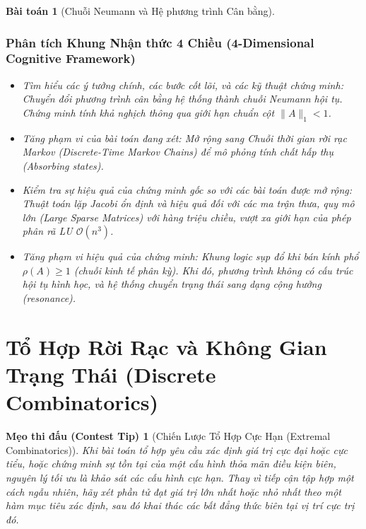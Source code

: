 \documentclass{article}
\newtheorem{baitoan}{Bài toán}
\newtheorem{tip}{Mẹo thi đấu (Contest Tip)}
\begin{document}
\begin{baitoan}[Chuỗi Neumann và Hệ phương trình Cân bằng]
 \subsubsection*{Phân tích Khung Nhận thức 4 Chiều (4-Dimensional Cognitive Framework)}
 \begin{itemize}
 \item \textit{Tìm hiểu các ý tưởng chính, các bước cốt lõi, và các kỹ thuật chứng minh}: Chuyển đổi phương trình cân bằng hệ thống thành chuỗi Neumann hội tụ. Chứng minh tính khả nghịch thông qua giới hạn chuẩn cột $\|A\|_1 < 1$.
 \item \textit{Tăng phạm vi của bài toán đang xét}: Mở rộng sang Chuỗi thời gian rời rạc Markov (Discrete-Time Markov Chains) để mô phỏng tính chất hấp thụ (Absorbing states).
 \item \textit{Kiểm tra sự hiệu quả của chứng minh gốc so với các bài toán được mở rộng}: Thuật toán lặp Jacobi ổn định và hiệu quả đối với các ma trận thưa, quy mô lớn (Large Sparse Matrices) với hàng triệu chiều, vượt xa giới hạn của phép phân rã LU $\mathcal{O}(n^3)$.
 \item \textit{Tăng phạm vi hiệu quả của chứng minh}: Khung logic sụp đổ khi bán kính phổ $\rho(A) \ge 1$ (chuỗi kinh tế phân kỳ). Khi đó, phương trình không có cấu trúc hội tụ hình học, và hệ thống chuyển trạng thái sang dạng cộng hưởng (resonance).
 \end{itemize}
\end{baitoan}



\section{Tổ Hợp Rời Rạc và Không Gian Trạng Thái (Discrete Combinatorics)}

\begin{tip}[Chiến Lược Tổ Hợp Cực Hạn (Extremal Combinatorics)]
Khi bài toán tổ hợp yêu cầu xác định giá trị cực đại hoặc cực tiểu, hoặc chứng minh sự tồn tại của một cấu hình thỏa mãn điều kiện biên, nguyên lý tối ưu là khảo sát các cấu hình cực hạn. Thay vì tiếp cận tập hợp một cách ngẫu nhiên, hãy xét phần tử đạt giá trị lớn nhất hoặc nhỏ nhất theo một hàm mục tiêu xác định, sau đó khai thác các bất đẳng thức biên tại vị trí cực trị đó.
\end{tip}
\end{document}
